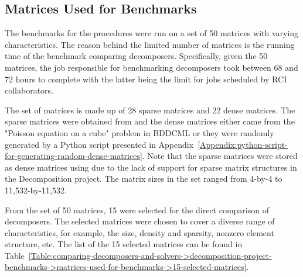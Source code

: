 \subsection{Matrices Used for Benchmarks}\label{Subsection:comparing-decomposers-and-solvers->decomposition-project-benchmarks->matrices-used-for-benchmarks}
The benchmarks for the procedures were run on a set of 50 matrices with varying characteristics. The reason behind the limited number of matrices is the running time of the benchmark comparing decomposers. Specifically, given the 50 matrices, the job responsible for benchmarking decomposers took between 68 and 72 hours to complete with the latter being the limit for jobs scheduled by RCI collaborators.

The set of matrices is made up of 28 sparse matrices and 22 dense matrices. The sparse matrices were obtained from  \cite{Davis2011} and the dense matrices either came from the "Poisson equation on a cube" problem in BDDCML or they were randomly generated by a Python script presented in Appendix~\ref{Appendix:python-script-for-generating-random-dense-matrices}. Note that the sparse matrices were stored as dense matrices using  due to the lack of support for sparse matrix structures in the Decomposition project. The matrix sizes in the set ranged from 4-by-4 to 11,532-by-11,532.

From the set of 50 matrices, 15 were selected for the direct comparison of decomposers. The selected matrices were chosen to cover a diverse range of characteristics, for example, the size, density and sparsity, nonzero element structure, etc. The list of the 15 selected matrices can be found in Table~\ref{Table:comparing-decomposers-and-solvers->decomposition-project-benchmarks->matrices-used-for-benchmarks->15-selected-matrices}.

